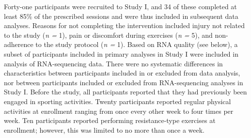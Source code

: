 \documentclass[twoside,10pt]{gihclass} %
\begin{document}
Forty-one participants were recruited to Study I, and 34 of these completed at least 85\% of the prescribed sessions and were thus included in subsequent data analyses. Reasons for not completing the intervention included injury not related to the study (\emph{n =} 1), pain or discomfort during exercises (\emph{n =} 5), and non-adherence to the study protocol (\emph{n =} 1). Based on RNA quality (see below), a subset of participants included in primary analyses in Study I were included in analysis of RNA-sequencing data. There were no systematic differences in characteristics between participants included in or excluded from data analysis, nor between participants included or excluded from RNA-sequencing analyses in Study I. Before the study, all participants reported that they had previously been engaged in sporting activities. Twenty participants reported regular physical activities at enrollment ranging from once every other week to four times per week. Ten participants reported performing resistance-type exercises at enrollment; however, this was limited to no more than once a week.
\end{document}
